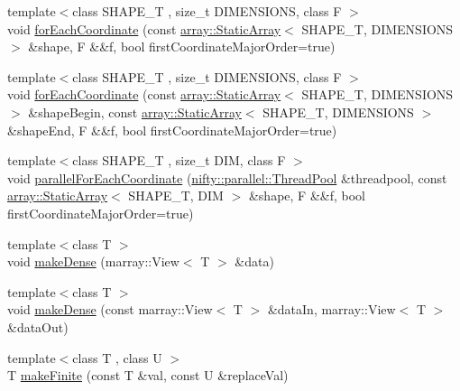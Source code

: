 \begin{DoxyCompactItemize}
\item 
{\footnotesize template$<$class S\+H\+A\+P\+E\+\_\+\+T , size\+\_\+t D\+I\+M\+E\+N\+S\+I\+O\+N\+S, class F $>$ }\\void \hyperlink{namespacenifty_1_1tools_a81df2669bba7acc0ad9a253669a28ba4}{for\+Each\+Coordinate} (const \hyperlink{namespacenifty_1_1array_a683f151f19c851754e0c6d55ed16a0c2}{array\+::\+Static\+Array}$<$ S\+H\+A\+P\+E\+\_\+\+T, D\+I\+M\+E\+N\+S\+I\+O\+N\+S $>$ \&shape, F \&\&f, bool first\+Coordinate\+Major\+Order=true)
\item 
{\footnotesize template$<$class S\+H\+A\+P\+E\+\_\+\+T , size\+\_\+t D\+I\+M\+E\+N\+S\+I\+O\+N\+S, class F $>$ }\\void \hyperlink{namespacenifty_1_1tools_a757aec65ec994397f40a807952edd219}{for\+Each\+Coordinate} (const \hyperlink{namespacenifty_1_1array_a683f151f19c851754e0c6d55ed16a0c2}{array\+::\+Static\+Array}$<$ S\+H\+A\+P\+E\+\_\+\+T, D\+I\+M\+E\+N\+S\+I\+O\+N\+S $>$ \&shape\+Begin, const \hyperlink{namespacenifty_1_1array_a683f151f19c851754e0c6d55ed16a0c2}{array\+::\+Static\+Array}$<$ S\+H\+A\+P\+E\+\_\+\+T, D\+I\+M\+E\+N\+S\+I\+O\+N\+S $>$ \&shape\+End, F \&\&f, bool first\+Coordinate\+Major\+Order=true)
\item 
{\footnotesize template$<$class S\+H\+A\+P\+E\+\_\+\+T , size\+\_\+t D\+I\+M, class F $>$ }\\void \hyperlink{namespacenifty_1_1tools_a34595523082dffa3f21d4b40cc13cfae}{parallel\+For\+Each\+Coordinate} (\hyperlink{classnifty_1_1parallel_1_1ThreadPool}{nifty\+::parallel\+::\+Thread\+Pool} \&threadpool, const \hyperlink{namespacenifty_1_1array_a683f151f19c851754e0c6d55ed16a0c2}{array\+::\+Static\+Array}$<$ S\+H\+A\+P\+E\+\_\+\+T, D\+I\+M $>$ \&shape, F \&\&f, bool first\+Coordinate\+Major\+Order=true)
\item 
{\footnotesize template$<$class T $>$ }\\void \hyperlink{namespacenifty_1_1tools_a2c8c36d25cd0360146bec83f981de045}{make\+Dense} (marray\+::\+View$<$ T $>$ \&data)
\item 
{\footnotesize template$<$class T $>$ }\\void \hyperlink{namespacenifty_1_1tools_a0fba3a0bb159e35a054e7ea8f258c4c3}{make\+Dense} (const marray\+::\+View$<$ T $>$ \&data\+In, marray\+::\+View$<$ T $>$ \&data\+Out)
\item 
{\footnotesize template$<$class T , class U $>$ }\\T \hyperlink{namespacenifty_1_1tools_abefcf35b4e6658bb8179a41a2de97d9e}{make\+Finite} (const T \&val, const U \&replace\+Val)
\end{DoxyCompactItemize}


